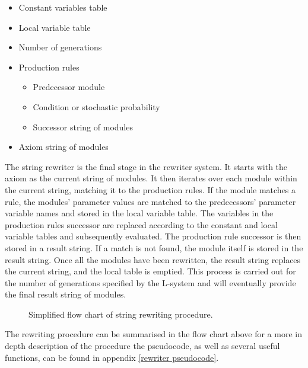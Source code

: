 \begin{singlespace}
\begin{itemize}
	\item Constant variables table
	\item Local variable table
	\item Number of generations
	\item Production rules
	\begin{itemize}
		\item Predecessor module
		\item Condition or stochastic probability
		\item Successor string of modules
	\end{itemize}
	\item Axiom string of modules
\end{itemize}
\end{singlespace}

\newpage
\noindent
The string rewriter is the final stage in the rewriter system. It starts with the axiom as the current string of modules. It then iterates over each module within the current string, matching it to the production rules. If the module matches a rule, the modules' parameter values are matched to the predecessors' parameter variable names and stored in the local variable table. The variables in the production rules successor are replaced according to the constant and local variable tables and subsequently evaluated. The production rule successor is then stored in a result string. If a match is not found, the module itself is stored in the result string. Once all the modules have been rewritten, the result string replaces the current string, and the local table is emptied. This process is carried out for the number of generations specified by the L-system and will eventually provide the final result string of modules.

\begin{figure}[htbp]
	{\centering
		\setlength{\fboxrule}{1pt}
		\vspace{7px}
		\caption{Simplified flow chart of string rewriting procedure.} \label{rewriter diagram}
	}
\end{figure}
\FloatBarrier

\noindent
The rewriting procedure can be summarised in the flow chart above for a more in depth description of the procedure the pseudocode, as well as several useful functions, can be found in appendix \ref{rewriter pseudocode}. 

